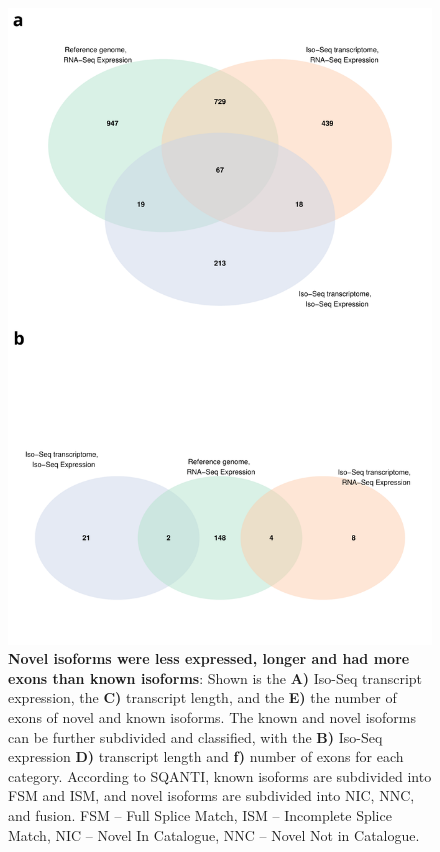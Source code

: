 \begin{figure}[h]
	\begin{center}
		\includegraphics[page=2,scale = 0.55]{Figures/WholeDifferentialAnalysis.pdf}
	\end{center}
	\captionsetup{width=0.95\textwidth}
	\caption[Comparison of Known and Novel Isoforms from Iso-Seq Whole Transcriptome runs]%
	{\textbf{Novel isoforms were less expressed, longer and had more exons than known isoforms}: Shown is the \textbf{A)} Iso-Seq transcript expression, the \textbf{C)} transcript length, and the \textbf{E)} the number of exons of novel and known isoforms. The known and novel isoforms can be further subdivided and classified, with the \textbf{B)} Iso-Seq expression \textbf{D)} transcript length and \textbf{f)} number of exons for each category. According to SQANTI, known isoforms are subdivided into FSM and ISM, and novel isoforms are subdivided into NIC, NNC, and fusion. FSM – Full Splice Match, ISM – Incomplete Splice Match, NIC – Novel In Catalogue, NNC – Novel Not in Catalogue.}   
	\label{fig:whole_dea}
\end{figure}


